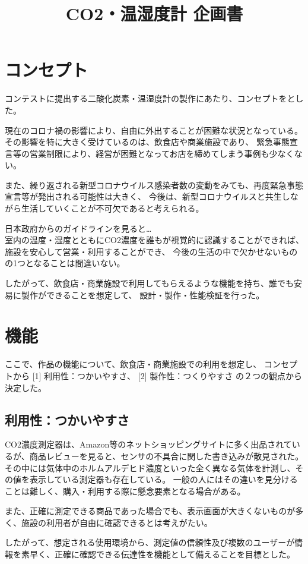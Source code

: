 \documentclass[a4paper]{jsarticle}
\author{}
\title{CO2・温湿度計 企画書}
\date{}
\begin{document}
\maketitle
\section{コンセプト}
コンテストに提出する二酸化炭素・温湿度計の製作にあたり、コンセプトをとした。\par
現在のコロナ禍の影響により、自由に外出することが困難な状況となっている。
その影響を特に大きく受けているのは、飲食店や商業施設であり、
緊急事態宣言等の営業制限により、経営が困難となってお店を締めてしまう事例も少なくない。\par
また、繰り返される新型コロナウイルス感染者数の変動をみても、再度緊急事態宣言等が発出される可能性は大きく、
今後は、新型コロナウイルスと共生しながら生活していくことが不可欠であると考えられる。\par
日本政府からのガイドラインを見ると…\\
室内の温度・湿度とともにCO2濃度を誰もが視覚的に認識することができれば、施設を安心して営業・利用することができ、
今後の生活の中で欠かせないものの1つとなることは間違いない。\par
したがって、飲食店・商業施設で利用してもらえるような機能を持ち、誰でも安易に製作ができることを想定して、
設計・製作・性能検証を行った。
\section{機能}
ここで、作品の機能について、飲食店・商業施設での利用を想定し、
コンセプトから [1] 利用性：つかいやすさ、 [2] 製作性：つくりやすさ の２つの観点から決定した。
\subsection{利用性：つかいやすさ}
CO2濃度測定器は、Amazon等のネットショッピングサイトに多く出品されているが、商品レビューを見ると、センサの不具合に関した書き込みが散見された。
その中には気体中のホルムアルデヒド濃度といった全く異なる気体を計測し、その値を表示している測定器も存在している。
一般の人にはその違いを見分けることは難しく、購入・利用する際に懸念要素となる場合がある。\par
また、正確に測定できる商品であった場合でも、表示画面が大きくないものが多く、施設の利用者が自由に確認できるとは考えがたい。\par
したがって、想定される使用環境から、測定値の信頼性及び複数のユーザーが情報を素早く、正確に確認できる伝達性を機能として備えることを目標とした。
\end{document}
